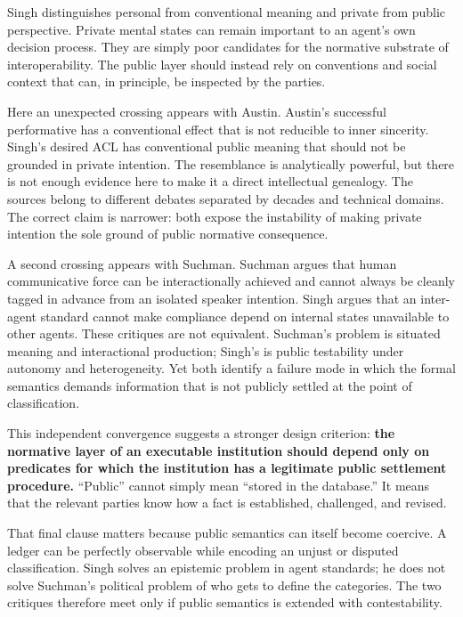 \documentclass[11pt]{article}
\begin{document}
Singh distinguishes personal from conventional meaning and private from public perspective. Private mental states can remain important to an agent's own decision process. They are simply poor candidates for the normative substrate of interoperability. The public layer should instead rely on conventions and social context that can, in principle, be inspected by the parties. \cite{singh1998rethinking}

Here an unexpected crossing appears with Austin. Austin's successful performative has a conventional effect that is not reducible to inner sincerity. Singh's desired ACL has conventional public meaning that should not be grounded in private intention. The resemblance is analytically powerful, but there is not enough evidence here to make it a direct intellectual genealogy. The sources belong to different debates separated by decades and technical domains. The correct claim is narrower: both expose the instability of making private intention the sole ground of public normative consequence.

A second crossing appears with Suchman. Suchman argues that human communicative force can be interactionally achieved and cannot always be cleanly tagged in advance from an isolated speaker intention. Singh argues that an inter-agent standard cannot make compliance depend on internal states unavailable to other agents. These critiques are not equivalent. Suchman's problem is situated meaning and interactional production; Singh's is public testability under autonomy and heterogeneity. Yet both identify a failure mode in which the formal semantics demands information that is not publicly settled at the point of classification.

This independent convergence suggests a stronger design criterion: \textbf{the normative layer of an executable institution should depend only on predicates for which the institution has a legitimate public settlement procedure.} ``Public'' cannot simply mean ``stored in the database.'' It means that the relevant parties know how a fact is established, challenged, and revised.

That final clause matters because public semantics can itself become coercive. A ledger can be perfectly observable while encoding an unjust or disputed classification. Singh solves an epistemic problem in agent standards; he does not solve Suchman's political problem of who gets to define the categories. The two critiques therefore meet only if public semantics is extended with contestability.
\end{document}
